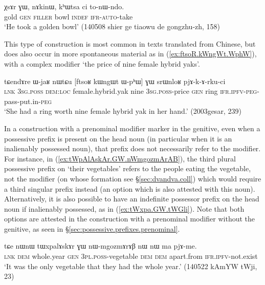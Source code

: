 \begin{exe}
\ex \label{ex:χsAr.GW.khWtsa}
\gll  χsɤr ɣɯ, nɤkinɯ, kʰɯtsa ci to-nɯ-ndo. \\
gold \textsc{gen} \textsc{filler} bowl \textsc{indef} \textsc{ifr}-\textsc{auto}-take \\
\glt `He took a golden bowl' (140508 shier ge tiaowu de gongzhu-zh, 158)
\end{exe}

This type of construction is most common in texts translated from Chinese, but does also occur in more spontaneous material as in (\ref{ex:ftsoR.kWngWt.WphW}), with a complex modifier  `the price of nine female hybrid yaks'.

\begin{exe}
\ex \label{ex:ftsoR.kWngWt.WphW}
\gll tɕendɤre ɯ-jaʁ nɯtɕu [ftsoʁ kɯngɯt ɯ-pʰɯ] ɣɯ srɯnloʁ pjɤ-k-ɤ-rku-ci \\
\textsc{lnk} \textsc{3sg}.\textsc{poss} \textsc{dem}:\textsc{loc} female.hybrid.yak nine \textsc{3sg}.\textsc{poss}-price \textsc{gen} ring \textsc{ifr}.\textsc{ipfv}-\textsc{peg}-pass-put.in-\textsc{peg} \\
\glt `She had a ring worth nine female hybrid yak in her hand.' (2003gesar, 239)
\end{exe}

In a construction with a prenominal modifier marker in the genitive, even when a possessive prefix is present on the head noun (in particular when it is an inalienably possessed noun), that prefix does not necessarily refer to the modifier. For instance, in (\ref{ex:tWpAlAskAr.GW.nWmgozmArAB}), the third plural possessive prefix  on  `their vegetables' refers to the people eating the vegetable, not  the modifier  (on whose formation see §\ref{sec:dvandva.coll}) which would require a third singular prefix instead (an option which is also attested with this noun). Alternatively, it is also possible to have an indefinite possessor prefix on the head noun if inalienably possessed, as in (\ref{ex:tWxpa.GW.tWGli}). Note that both options are attested in the construction with a prenominal modifier without the genitive, as seen in §\ref{sec:possessive.prefixes.prenominal}.
 
 \begin{exe}
\ex \label{ex:tWpAlAskAr.GW.nWmgozmArAB}
\gll  tɕe nɯnɯ tɯxpalɤskɤr ɣɯ nɯ-mgozmɤrɤβ nɯ nɯ ma pjɤ-me.  \\
\textsc{lnk} \textsc{dem} whole.year \textsc{gen} \textsc{3pl}.\textsc{poss}-vegetable \textsc{dem} \textsc{dem} apart.from \textsc{ifr}.\textsc{ipfv}-not.exist \\
\glt `It was the only vegetable that they had the whole year.'  (140522 kAmYW tWji, 23)
\end{exe}

